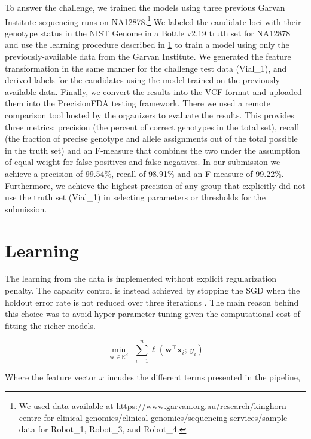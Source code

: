 \documentclass{article}
\newcommand{\w}{\mathbf{w}}
\newcommand{\x}{\mathbf{x}}
\newcommand{\R}{\mathbb{R}}
\newcommand{\tr}{{\!\top}}
\begin{document}
To answer the challenge, we trained the models using three previous Garvan Institute sequencing runs on NA12878.\footnote{We used data available at https://www.garvan.org.au/research/kinghorn-centre-for-clinical-genomics/clinical-genomics/sequencing-services/sample-data for Robot\_1, Robot\_3, and Robot\_4.}
We labeled the candidate loci with their genotype status in the NIST Genome in a Bottle v2.19 truth set for NA12878 and use the learning procedure described in \ref{sec:learning} to train a model using only the previously-available data from the Garvan Institute.
We generated the feature transformation in the same manner for the challenge test data (Vial\_1), and derived labels for the candidates using the model trained on the previously-available data.
Finally, we convert the results into the VCF format and uploaded them into the PrecisionFDA testing framework.
There we used a remote comparison tool hosted by the organizers to evaluate the results.
This provides three metrics: precision (the percent of correct genotypes in the total set), recall (the fraction of precise genotype and allele assignments out of the total possible in the truth set) and an F-measure that combines the two under the assumption of equal weight for false positives and false negatives.
In our submission we achieve a precision of 99.54\%, recall of 98.91\% and an F-measure of 99.22\%.
Furthermore, we achieve the highest precision of any group that explicitly did not use the truth set (Vial\_1) in selecting parameters or thresholds for the submission.

\section{Learning}
\label{sec:learning}

The learning from the data is implemented without explicit regularization penalty. The capacity control is instead achieved by stopping the SGD when the holdout error rate is not reduced over three iterations \citep{hardt2015train}.
The main reason behind this choice was to avoid hyper-parameter tuning given the computational cost of fitting the richer models.


\begin{equation}
  \min_{\w \in \R^d}~~\sum_{i=1}^n\ell(\w^\tr\x_i;\,y_i) 
  \label{eqn:objective}
\end{equation}

Where the feature vector $x$ incudes the different terms presented in the pipeline, 
\end{document}
